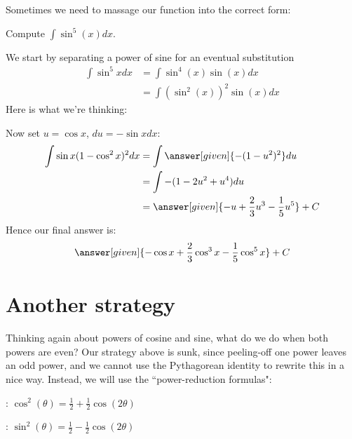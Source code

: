 \documentclass{ximera}
\begin{document}
Sometimes we need to massage our function into the correct form:

\begin{example}
  Compute $\int \sin^5(x) dx$.
  
  \begin{explanation}
    We start by separating a power of sine for an eventual substitution
    \begin{align*}
      \int \sin^5 xdx &=\int \sin^4(x) \sin(x) dx\\
      &=\int (\sin^2(x))^2 \sin(x) dx
    \end{align*}
    Here is what we're thinking:
    \begin{center}%
    \end{center}
    Now set $u=\cos x$, $du=-\sin xdx$:
    \begin{align*}
      \int \sin x (1-\cos^2 x)^2dx&=\int \answer[given]{-(1-u^2)^2} du \\
      &=\int -(1-2u^2+u^4)du \\
      &=\answer[given]{-u+\frac{2}{3}u^3-\frac{1}{5}u^5}+C
    \end{align*}
    Hence our final answer is:
    \[
    \answer[given]{-\cos x+\frac{2}{3}\cos^3 x-\frac{1}{5}\cos^5x}+C
    \]
  \end{explanation}
\end{example}

\section{Another strategy}

Thinking again about powers of cosine and sine, what do we do when both powers are even?  Our strategy above is sunk, since peeling-off one power leaves an odd power, and we cannot use the Pythagorean identity to rewrite this in a nice way.  Instead, we will use the ``power-reduction formulas":

\begin{description}
\item[Cosine Power-Reduction]: $\cos^2(\theta)= \frac{1}{2}+\frac{1}{2}\cos(2\theta)$ 
\item[Sine Power-Reduction]: $\sin^2(\theta) = \frac{1}{2}-\frac{1}{2}\cos(2\theta)$
\end{description}
\end{document}
